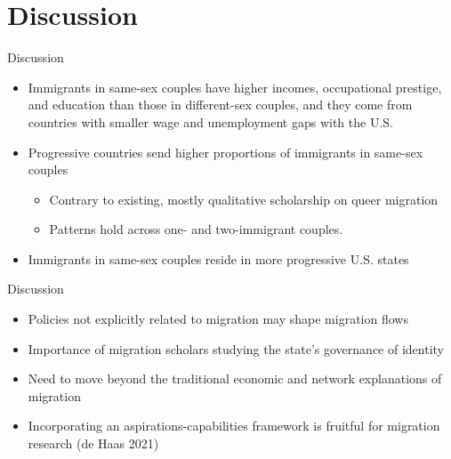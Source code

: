 \documentclass[
  ignorenonframetext,
]{beamer}
\providecommand{\tightlist}{%
  \setlength{\itemsep}{0pt}\setlength{\parskip}{0pt}}
\begin{document}
\hypertarget{discussion}{%
\section{Discussion}\label{discussion}}

\begin{frame}{Discussion}
\protect\hypertarget{discussion-1}{}
\begin{itemize}
\tightlist
\item
  Immigrants in same-sex couples have higher incomes, occupational
  prestige, and education than those in different-sex couples, and they
  come from countries with smaller wage and unemployment gaps with the
  U.S.
\item
  Progressive countries send higher proportions of immigrants in
  same-sex couples

  \begin{itemize}
  \tightlist
  \item
    Contrary to existing, mostly qualitative scholarship on queer
    migration
  \item
    Patterns hold across one- and two-immigrant couples.
  \end{itemize}
\item
  Immigrants in same-sex couples reside in more progressive U.S. states
\end{itemize}
\end{frame}

\begin{frame}{Discussion}
\protect\hypertarget{discussion-2}{}
\begin{itemize}
\tightlist
\item
  Policies not explicitly related to migration may shape migration flows
\item
  Importance of migration scholars studying the state's governance of
  identity
\item
  Need to move beyond the traditional economic and network explanations
  of migration
\item
  Incorporating an aspirations-capabilities framework is fruitful for
  migration research (de Haas 2021)
\end{itemize}
\end{frame}
\end{document}
